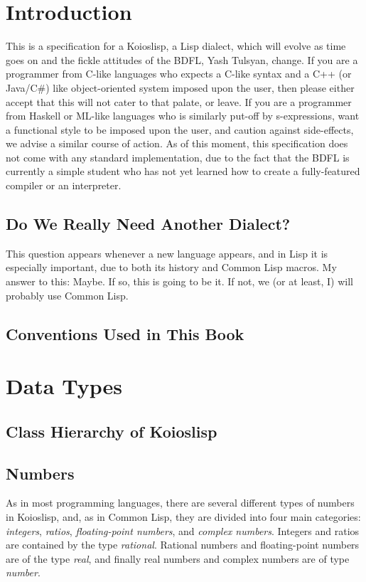 \documentclass[10pt]{book}
\begin{document}
\chapter{Introduction}
This is a specification for a {\sc Koioslisp}, a {\sc Lisp} dialect, which will evolve as time goes on and the fickle attitudes of the BDFL, Yash Tulsyan, change. If you are a programmer from C-like languages who expects a C-like syntax and a C++ (or Java/C\#) like object-oriented system imposed upon the user, then please either accept that this will not cater to that palate, or leave. If you are a programmer from Haskell or ML-like languages who is similarly put-off by s-expressions, want a functional style to be imposed upon the user, and caution against side-effects, we advise a similar course of action. As of this moment, this specification does not come with any standard implementation, due to the fact that the BDFL is currently a simple student who has not yet learned how to create a fully-featured compiler or an interpreter.
\section{Do We Really Need Another Dialect?}
This question appears whenever a new language appears, and in Lisp it is especially important, due to both its history and {\sc Common Lisp} macros. My answer to this: Maybe. If so, this is going to be it. If not, we (or at least, I) will probably use Common Lisp.
\section{Conventions Used in This Book}
\chapter{Data Types}
\section{Class Hierarchy of Koioslisp}

\section{Numbers}
As in most programming languages, there are several different types of numbers in {\sc Koioslisp}, and, as in Common Lisp, they are divided into four main categories: \textit{integers}, \textit{ratios}, \textit{floating-point numbers}, and \textit{complex numbers}. Integers and ratios are contained by the type \textit{rational}. Rational numbers and floating-point numbers are of the type \textit{real}, and finally real numbers and complex numbers are of type \textit{number}.
\end{document}
